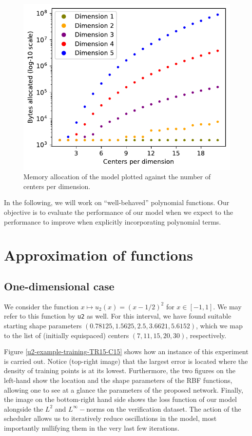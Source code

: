 \documentclass[12pt]{report} %
\begin{document}
\begin{figure}
  \includegraphics[width=.7\textwidth]{imagenes/model_consumption/Memory_allocation_vs_number_of_centers_per_dimension.pdf}
  \caption{Memory allocation of the model plotted against the number of centers per dimension.}
  \label{fig:model-consumption-memory}
\end{figure}

In the following, we will work on ``well-behaved'' polynomial functions. Our objective is to evaluate the performance of our model when we expect to the performance to improve when explicitly incorporating polynomial terms. %

\section{Approximation of functions}



\subsection*{One-dimensional case}

We consider the function $x \mapsto u_2(x)=(x-1/2)^2$ for $x \in [-1,1]$. We may refer to this function by \texttt{u2} as well. For this interval, we have found suitable starting shape parameters $(0.78125, 1.5625, 2.5, 3.6621, 5.6152)$, which we map to the list of (initially equispaced) centers $(7,11,15,20,30)$, respectively.

Figure \ref{u2-example-training-TR15-C15} shows how an instance of this experiment is carried out. Notice (top-right image) that the largest error is located where the density of training points is at its lowest. Furthermore, the two figures on the left-hand show the location and the shape parameters of the RBF functions, allowing one to see at a glance the parameters of the proposed network. Finally, the image on the bottom-right hand side shows the loss function of our model alongside the $L^2$ and $L^\infty-$norms on the verification dataset. The action of the scheduler allows us to iteratively reduce oscillations in the model, most importantly nullifying them in the very last few iterations.
\end{document}
